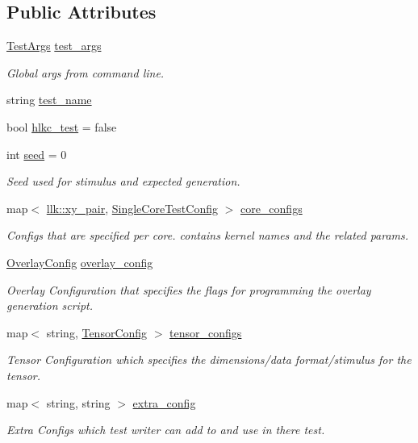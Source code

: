 \subsection*{Public Attributes}
\begin{DoxyCompactItemize}
\item 
\hyperlink{structtests_1_1TestArgs}{Test\+Args} \hyperlink{structtests_1_1TestConfig_aa030c4b4c3fb91e5d6ac2524d408e727}{test\+\_\+args}
\begin{DoxyCompactList}\small\item\em Global args from command line. \end{DoxyCompactList}\item 
string \hyperlink{structtests_1_1TestConfig_aee3a781ac75f698787b6fcd81ca060bb}{test\+\_\+name}
\item 
bool \hyperlink{structtests_1_1TestConfig_ad3c14921521c690e03ab5664a69d9efc}{hlkc\+\_\+test} = false
\item 
int \hyperlink{structtests_1_1TestConfig_a948808f31f8064964a14f33bd2e01068}{seed} = 0
\begin{DoxyCompactList}\small\item\em Seed used for stimulus and expected generation. \end{DoxyCompactList}\item 
map$<$ \hyperlink{structllk_1_1xy__pair}{llk\+::xy\+\_\+pair}, \hyperlink{structtests_1_1SingleCoreTestConfig}{Single\+Core\+Test\+Config} $>$ \hyperlink{structtests_1_1TestConfig_ae5193ec96cb529d0e40360c46e4b6b42}{core\+\_\+configs}
\begin{DoxyCompactList}\small\item\em Configs that are specified per core. contains kernel names and the related params. \end{DoxyCompactList}\item 
\hyperlink{structtests_1_1OverlayConfig}{Overlay\+Config} \hyperlink{structtests_1_1TestConfig_a985dffa5724992426ad6e6dc8e7fe39b}{overlay\+\_\+config}
\begin{DoxyCompactList}\small\item\em Overlay Configuration that specifies the flags for programming the overlay generation script. \end{DoxyCompactList}\item 
map$<$ string, \hyperlink{structtests_1_1TensorConfig}{Tensor\+Config} $>$ \hyperlink{structtests_1_1TestConfig_a0987a4cdba40e31d224181c17e5c042a}{tensor\+\_\+configs}
\begin{DoxyCompactList}\small\item\em Tensor Configuration which specifies the dimensions/data format/stimulus for the tensor. \end{DoxyCompactList}\item 
map$<$ string, string $>$ \hyperlink{structtests_1_1TestConfig_ac2374c533a372b8f7183de6215fe9791}{extra\+\_\+config}
\begin{DoxyCompactList}\small\item\em Extra Configs which test writer can add to and use in there test. \end{DoxyCompactList}\end{DoxyCompactItemize}


